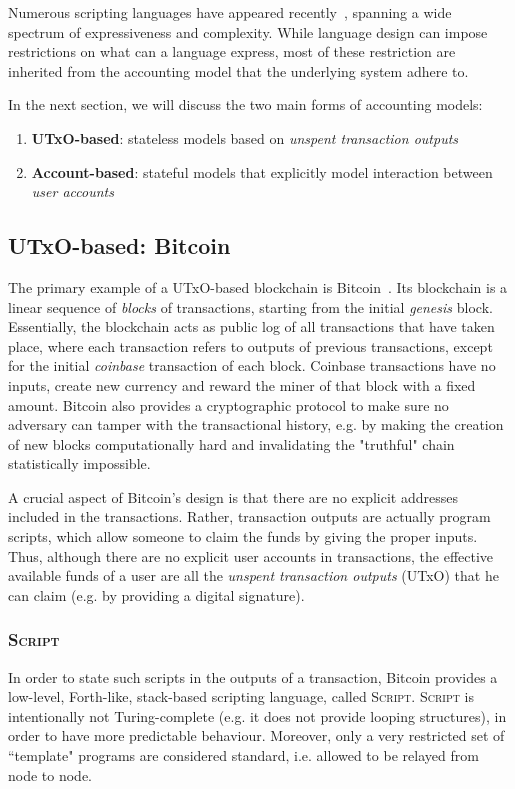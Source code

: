 \documentclass[acmsmall,nonacm=true,screen=true]{acmart}
\begin{document}
Numerous scripting languages have appeared recently~\cite{scriptlangs}, spanning a wide
spectrum of expressiveness and complexity. While language design can impose restrictions
on what can a language express, most of these restriction are inherited from
the accounting model that the underlying system adhere to.

In the next section, we will discuss the two main forms of accounting models:
\begin{enumerate}
\item \textbf{UTxO-based}: stateless models based on \textit{unspent transaction outputs}
\item \textbf{Account-based}: stateful models that explicitly model interaction between \textit{user accounts}
\end{enumerate}

\subsection{UTxO-based: Bitcoin} \label{subsec:bitcoin}
The primary example of a UTxO-based blockchain is Bitcoin~\cite{bitcoin}.
Its blockchain is a linear sequence of \textit{blocks} of transactions,
starting from the initial \textit{genesis} block.
Essentially, the blockchain acts as public log of all transactions that have taken place, where
each transaction refers to outputs of previous transactions,
except for the initial \textit{coinbase} transaction of each block.
Coinbase transactions have no inputs, create new currency and reward the miner of that block with a fixed amount.
Bitcoin also provides a cryptographic protocol to make sure no adversary can tamper with the transactional history,
e.g. by making the creation of new blocks computationally hard and invalidating the "truthful" chain statistically impossible.

A crucial aspect of Bitcoin's design is that there are no explicit addresses included in the transactions.
Rather, transaction outputs are actually program scripts, which allow someone to claim the funds by giving the proper inputs.
Thus, although there are no explicit user accounts in transactions, the effective available funds of a user
are all the \textit{unspent transaction outputs} (UTxO) that he can claim (e.g. by providing a digital signature).

\subsubsection{\textsc{Script}}
In order to state such scripts in the outputs of a transaction, Bitcoin provides a low-level, Forth-like,
stack-based scripting language, called \textsc{Script}.
\textsc{Script} is intentionally not Turing-complete (e.g. it does not provide looping structures),
in order to have more predictable behaviour.
Moreover, only a very restricted set of ``template" programs are considered standard, i.e.
allowed to be relayed from node to node.
\end{document}
